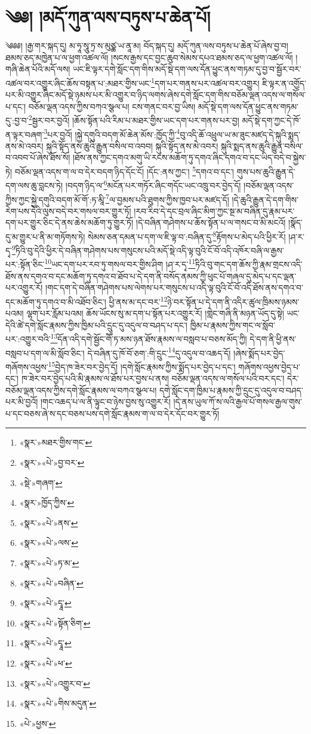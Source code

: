 \chapter{༄༅། །མདོ་ཀུན་ལས་བཏུས་པ་ཆེན་པོ།}༄༅༅། །རྒྱ་གར་སྐད་དུ། མ་ཧཱ་སཱུ་ཏྲ་ས་མུཙྪ་ཡ་ནཱ་མ། བོད་སྐད་དུ། མདོ་ཀུན་ལས་བཏུས་པ་ཆེན་པོ་ཞེས་བྱ་བ། ཐམས་ཅད་མཁྱེན་པ་ལ་ཕྱག་འཚལ་ལོ། །སངས་རྒྱས་དང་བྱང་ཆུབ་སེམས་དཔའ་ཐམས་ཅད་ལ་ཕྱག་འཚལ་ལོ། །གཞི་ཆེན་པོའི་མདོ་ལས། ཡང་ཇི་ལྟར་དགེ་སློང་དག་གིས་མདོ་སྡེ་དག་ལས་དོན་ཕྱུང་ནས་གཏམ་དུ་བྱ་བ་སྦྱོར་བར་འཚལ་བར་འགྱུར་ཞིང་ཆོས་བསྟན་པ་:མཐར་གྱིས་ཡང་\footnote{«སྣར་»མཐར་གྱིས་གང་}དག་པར་གནས་པར་འཚལ་བར་འགྱུར། ཇི་ལྟར་ན་འགྱོད་པར་མི་འགྱུར་ཞིང་མདོ་སྡེ་ཉམས་པར་མི་འགྱུར་བ་ཉིད་ལགས་ཞེས་དགེ་སློང་དག་གིས་བཅོམ་ལྡན་འདས་ལ་གསོལ་པ་དང་། བཅོམ་ལྡན་འདས་ཀྱིས་བཀའ་སྩལ་པ། ངས་གནང་བར་བྱ་ཡིས། མདོ་སྡེ་དག་ལས་དོན་ཕྱུང་ནས་གཏམ་དུ་:བྱ་བ་\footnote{«སྣར་»«པེ་»བྱ་བར་}སྦྱར་བར་བྱའོ། །ཆོས་སྟོན་པའི་རིམ་པ་མཐར་གྱིས་ཡང་དག་པར་གནས་པར་བྱ། མདོ་སྡེ་དག་ཀྱང་དེ་ཁོ་ན་ལྟར་བཞག་\footnote{«སྡེ་»གཞག་}པར་བྱའོ། །སྐྱེ་དགུའི་བདག་མོ་ཆེན་མོས་:ཁྱོད་ཀྱི་\footnote{«སྣར་»ཁྱོད་ཀྱིས་}བུ་འདི་ཆོ་འཕྲུལ་ཡ་མ་ཟུང་མཛད་དེ་སྐུའི་སྨད་ནས་མེ་འབར། སྐུའི་སྟོད་ནས་ཆུའི་རྒྱུན་བསིལ་བ་འབབ། སྐུའི་སྟོད་ནས་མེ་འབར། སྐུའི་སྨད་ནས་ཆུའི་རྒྱུན་བསིལ་བ་འབབ་པོ་ཞེས་ཐོས་སོ། །ཐོས་ནས་ཀྱང་དགའ་མགུ་ཡི་རངས་མཆོག་ཏུ་དགའ་ཞིང་དགའ་བ་དང་ཡིད་བདེ་བ་སྐྱེས་ཏེ། བཅོམ་ལྡན་འདས་ག་ལ་བ་དེར་བདག་ཉིད་དོང་ངོ། །དོང་:ནས་ཀྱང་། \footnote{«སྣར་»«པེ་»ནས་}དགའ་བ་དང་། གུས་པས་ཆུའི་རྒྱུན་དེ་དག་ལས་ཆུ་བླངས་ཏེ། །བདག་ཉིད་ལ་\footnote{«སྣར་»«པེ་»ལས་}མངོན་པར་གཏོར་ཞིང་གདོང་ཡང་འཁྲུ་བར་བྱེད་དོ། །བཅོམ་ལྡན་འདས་ཀྱིས་ཀྱང་སྐྱེ་དགུའི་བདག་མོ་གོ་:ཏ་མཱི་\footnote{«སྣར་»«པེ་»ཏ་མ་}ལ་བྱམས་པའི་ཐུགས་ཀྱིས་ཁྱབ་པར་མཛད་དོ། །དེ་ཆུའི་རྒྱུན་དེ་དག་གིས་རེག་པས་དེའི་ལུས་བདེ་བར་གསལ་བར་གྱུར་ཏོ། །རབ་རིབ་དེ་དང་བྲལ་ཞིང་མིག་ཀྱང་སྔ་མ་བཞིན་དུ་རྣམ་པར་དག་པར་གྱུར་ཅིང་དེ་ནས་ཆེས་མཆོག་ཏུ་གྱུར་ཏོ། །དེ་བཞིན་གཤེགས་པ་ཆོས་སྟོན་པ་ལ་གསང་བ་མི་མངའོ། །སྣོད་དུ་མ་གྱུར་པ་ནི་མ་གཏོགས་ཏེ། སེམས་ཅན་དམན་པ་དག་ལ་ཇི་ལྟ་བ་:བཞིན་དུ་\footnote{«སྣར་»«པེ་»བཞིན་}རྟོགས་པ་མེད་པའི་ཕྱིར་རོ། །ཤ་ར་དྭ་\footnote{«སྣར་»«པེ་»དྭཱ་}ཏིའི་བུ་དེའི་ཕྱིར་དེ་བཞིན་གཤེགས་པས་གསུངས་པའི་མདོ་སྡེ་འདི་ལྟ་བུའི་ངོ་བོ་འདི་འཁོར་བཞི་ལ་རྒྱས་པར་:སྟོན་ཅིང་\footnote{«སྣར་»«པེ་»སྟོན་ཅིག་}ཡང་དག་པར་རབ་ཏུ་གསལ་བར་གྱིས་ཤིག །ཤ་ར་དྭ་\footnote{«སྣར་»«པེ་»དྭཱ་}ཏིའི་བུ་གང་དག་ཆོས་ཀྱི་རྣམ་གྲངས་འདི་ཐོས་ནས་དགའ་བ་དང་མཆོག་ཏུ་དགའ་བ་ཐོབ་པ་དེ་དག་ནི་བསོད་ནམས་ཀྱི་ཕུང་པོ་གཞལ་དུ་མེད་པ་དང་ལྡན་པར་འགྱུར་རོ། །གང་དག་དེ་བཞིན་གཤེགས་པས་ལེགས་པར་གསུངས་པ་འདི་ལྟ་བུའི་ངོ་བོ་འདི་ཐོས་ནས་དགའ་བ་དང་མཆོག་ཏུ་དགའ་བ་མི་འཐོབ་ཅིང་། ཕྱི་ནས་མ་དང་བར་\footnote{«སྣར་»«པེ་»ཕ་}ཉེ་བར་སྟོན་པ་དེ་དག་ནི་འདིར་ཚུལ་ཁྲིམས་ཉམས་པའམ། ལྷག་པར་རློམ་པའམ། ཆོས་ཡོངས་སུ་མ་དག་པ་སྟོན་པར་འགྱུར་རོ། །གླེང་གཞི་ནི་མཉན་ཡོད་དུ་སྟེ། ཡང་དེའི་ཚེ་དགེ་སློང་རྣམས་ཀྱིས་ཁྱིམ་པའི་དྲུང་དུ་འདུལ་བ་བཤད་པ་དང་། ཁྱིམ་པ་རྣམས་ཀྱིས་གང་ལ་སློབ་པར་:འགྱུར་བའི་\footnote{«སྣར་»«པེ་»འགྱུར་བ་}དོན་འདི་དགེ་སྦྱོང་གཽ་ཏ་མས་ཉན་ཐོས་རྣམས་ལ་བསླབ་པ་བཅས་མོད་ཀྱི། དེ་དག་ནི་ཕྱི་ནས་བསླབ་པ་དག་ལ་མི་སློབ་ཅིང་། དེ་བཞིན་དུ་ཁོ་བོ་ཅག་:གི་དྲུང་\footnote{«སྣར་»«པེ་»གིས་མདུན་}དུ་འདུལ་བ་འཆད་དོ། །ཞེས་སྨོད་པར་བྱེད་གཞོགས་འཕྱས་\footnote{«པེ་»ཕྱས་}བྱེད་ཁ་ཟེར་བར་བྱེད་དོ། །དགེ་སློང་རྣམས་ཀྱིས་སྨོད་པར་བྱེད་པ་དང་། གཞོགས་འཕྱས་བྱེད་པ་དང་། ཁ་ཟེར་བར་བྱེད་པའི་མི་རྣམས་ལ་ཐོས་པར་བྱས་པ་ནས། བཅོམ་ལྡན་འདས་ལ་གསོལ་པའི་བར་དང་། དེར་བཅོམ་ལྡན་འདས་ཀྱིས་དགེ་སློང་རྣམས་ལ་བཀའ་སྩལ་པ། དགེ་སློང་དག་ཁྱིམ་པ་རྣམས་ཀྱི་དྲུང་དུ་འདུལ་བ་བཤད་པར་མི་བྱའོ། །གང་འཆད་པ་ལ་ནི་ལྟུང་བ་ཉེས་བྱས་སུ་འགྱུར་རོ། །དེ་ནས་ཡུལ་ཀོ་ས་ལའི་རྒྱལ་པོ་གསལ་རྒྱལ་གུས་པ་དང་བཅས་ཞེ་ས་དང་བཅས་པས་དགེ་སློང་རྣམས་ག་ལ་བ་དེར་དོང་བར་གྱུར་ཏོ། 